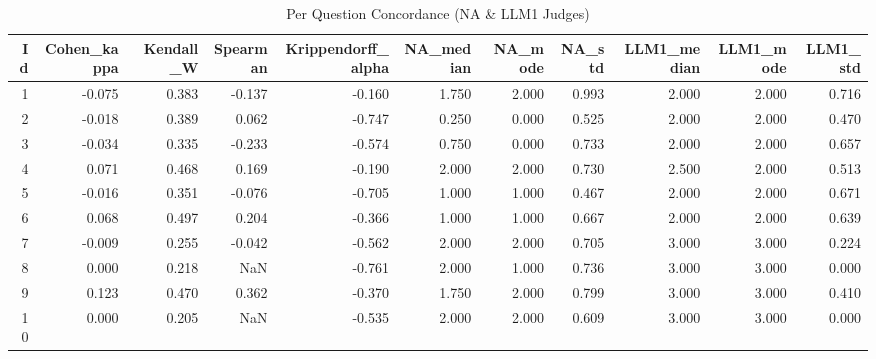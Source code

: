 \begin{table}
\caption{Per Question Concordance (NA & LLM1 Judges)}
\label{tab:per_question_concordance_NA_LLM1_judges}
\begin{tabular}{rrrrrrrrrrr}
\toprule
Id & Cohen_kappa & Kendall_W & Spearman & Krippendorff_alpha & NA_median & NA_mode & NA_std & LLM1_median & LLM1_mode & LLM1_std \\
\midrule
1 & -0.075 & 0.383 & -0.137 & -0.160 & 1.750 & 2.000 & 0.993 & 2.000 & 2.000 & 0.716 \\
2 & -0.018 & 0.389 & 0.062 & -0.747 & 0.250 & 0.000 & 0.525 & 2.000 & 2.000 & 0.470 \\
3 & -0.034 & 0.335 & -0.233 & -0.574 & 0.750 & 0.000 & 0.733 & 2.000 & 2.000 & 0.657 \\
4 & 0.071 & 0.468 & 0.169 & -0.190 & 2.000 & 2.000 & 0.730 & 2.500 & 2.000 & 0.513 \\
5 & -0.016 & 0.351 & -0.076 & -0.705 & 1.000 & 1.000 & 0.467 & 2.000 & 2.000 & 0.671 \\
6 & 0.068 & 0.497 & 0.204 & -0.366 & 1.000 & 1.000 & 0.667 & 2.000 & 2.000 & 0.639 \\
7 & -0.009 & 0.255 & -0.042 & -0.562 & 2.000 & 2.000 & 0.705 & 3.000 & 3.000 & 0.224 \\
8 & 0.000 & 0.218 & NaN & -0.761 & 2.000 & 1.000 & 0.736 & 3.000 & 3.000 & 0.000 \\
9 & 0.123 & 0.470 & 0.362 & -0.370 & 1.750 & 2.000 & 0.799 & 3.000 & 3.000 & 0.410 \\
10 & 0.000 & 0.205 & NaN & -0.535 & 2.000 & 2.000 & 0.609 & 3.000 & 3.000 & 0.000 \\
\bottomrule
\end{tabular}
\end{table}
